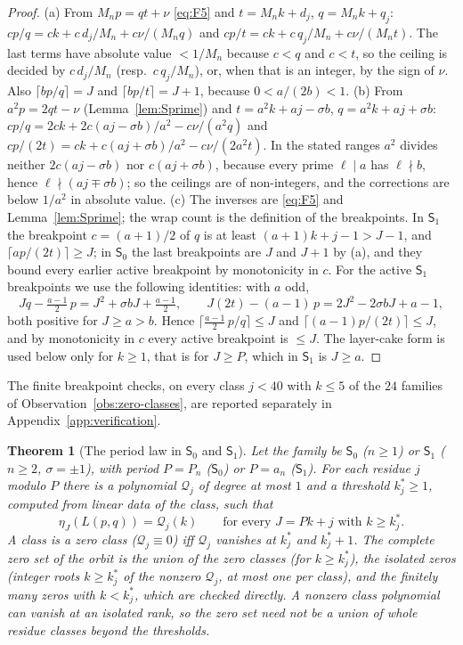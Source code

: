 \documentclass[11pt]{article}
\newtheorem{theorem}{Theorem}[section]
\theoremstyle{definition}
\begin{document}
\begin{proof}
(a) From $M_np=qt+\nu$ \eqref{eq:F5} and $t=M_nk+d_j$, $q=M_nk+q_j$:
$cp/q=ck+c\,d_j/M_n+c\nu/(M_nq)$ and $cp/t=ck+c\,q_j/M_n+c\nu/(M_nt)$.
The last terms have absolute value $<1/M_n$ because $c<q$ and $c<t$, so
the ceiling is decided by $c\,d_j/M_n$ (resp.\ $c\,q_j/M_n$), or, when
that is an integer, by the sign of $\nu$.  Also $\lceil bp/q\rceil=J$
and $\lceil bp/t\rceil=J+1$, because $0<a/(2b)<1$.
(b) From $a^2p=2qt-\nu$ (Lemma~\ref{lem:Sprime}) and $t=a^2k+aj-\sigma b$,
$q=a^2k+aj+\sigma b$: $cp/q=2ck+2c(aj-\sigma b)/a^2-c\nu/(a^2q)$ and
$cp/(2t)=ck+c(aj+\sigma b)/a^2-c\nu/(2a^2t)$.  In the stated ranges
$a^2$ divides neither $2c(aj-\sigma b)$ nor $c(aj+\sigma b)$, because
every prime $\ell\mid a$ has $\ell\nmid b$, hence
$\ell\nmid(aj\mp\sigma b)$; so the ceilings are of non-integers, and
the corrections are below $1/a^2$ in absolute value.
(c) The inverses are \eqref{eq:F5} and Lemma~\ref{lem:Sprime}; the wrap
count is the definition of the breakpoints.  In $\mathsf S_1$ the
breakpoint $c=(a+1)/2$ of $q$ is at least $(a+1)k+j-1>J-1$, and
$\lceil ap/(2t)\rceil\geq J$; in $\mathsf S_0$ the last breakpoints are
$J$ and $J+1$ by (a), and they bound every earlier active breakpoint by
monotonicity in $c$.  For the active $\mathsf S_1$ breakpoints we use the
following identities: with $a$ odd,
\[
 Jq-\tfrac{a-1}2\,p=J^2+\sigma bJ+\tfrac{a-1}2,\qquad
 J(2t)-(a-1)\,p=2J^2-2\sigma bJ+a-1,
\]
both positive for $J\geq a>b$.  Hence
$\lceil\frac{a-1}2\,p/q\rceil\leq J$ and $\lceil(a-1)p/(2t)\rceil\leq J$,
and by monotonicity in $c$ every active breakpoint is $\leq J$.  The
layer-cake form is used below only for $k\geq1$, that is for $J\geq P$,
which in $\mathsf S_1$ is $J\geq a$.
\end{proof}

The finite breakpoint checks, on every class $j<40$ with $k\leq5$ of
the $24$ families of Observation~\ref{obs:zero-classes}, are reported
separately in Appendix~\ref{app:verification}.

\begin{theorem}[The period law in $\mathsf S_0$ and $\mathsf S_1$]
\label{thm:PL}
Let the family be $\mathsf S_0$ ($n\geq1$) or $\mathsf S_1$ ($n\geq2$,
$\sigma=\pm1$), with period $P=P_n$ ($\mathsf S_0$) or $P=a_n$
($\mathsf S_1$).  For each residue $j$ modulo $P$ there is a polynomial
$\mathcal Q_j$ of degree at most $1$ and a threshold $k^*_j\geq1$, computed
from linear data of the class, such that
\begin{equation}
 \eta_J(L(p,q))=\mathcal Q_j(k)\qquad\text{for every }J=Pk+j\text{ with }k\geq k^*_j .
 \label{eq:PL}
\end{equation}
A class is a zero class ($\mathcal Q_j\equiv0$) iff $\mathcal Q_j$
vanishes at $k^*_j$ and $k^*_j+1$.  The complete zero set of
the orbit is the union of the zero classes (for $k\geq k^*_j$), the
isolated zeros (integer roots $k\geq k^*_j$ of the nonzero
$\mathcal Q_j$, at most one per class), and the finitely many zeros with
$k<k^*_j$, which are checked directly.  A nonzero class polynomial can
vanish at an isolated rank, so the zero set need not be a union of whole
residue classes beyond the thresholds.
\end{theorem}
\end{document}
